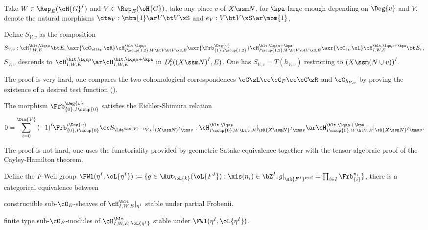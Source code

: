 \documentclass[a4paper, twoside]{article}
\begin{document}
\begin{stp}
	Take $W\in\Rep_{E}(\oH{G}^{I})$ and $V\in\Rep_{E}(\oH{G})$, take any place $v$ of $X\ssm N$, for $\kpa$ large enough depending on $\Deg{v}$ and $V$, denote the natural morphisms $\dta_{V}:\mbm{1}\ar V\bt V\xS$ and $e_{V}:V\bt V\xS\ar \mbm{1}$,
\end{stp}

\begin{thm}[$S=T$, {\cite[Proposition~6.2]{Lafforgue2018Chtoucas}}]
	Define $S_{V,v}$ as the composition
	\[
		S_{V,v}:\cH_{I,W,E}^{\blt,\lqs\mu}\bt E_{v}\axr{\cC_{\dta_{V}}\xR}\cH_{I\scup\{1,2\},W\bt V\bt V\xS,E}^{\blt,\lqs\mu}\axr{\Frb_{\{1\},I\scup\{1,2\}}^{\Deg{v}}}\cH_{I\scup\{1,2\},W\bt V\bt V\xS,E}^{\blt,\lqs\mu+\kpa}\axr{\cC_{e_{V}}\xL}\cH_{I,W,E}^{\blt,\lqs\mu+\kpa}\bt E_{v},
	\]
	$S_{V,v}$ descends to $\cH_{I,W,E}^{\blt,\lqs\mu}\ar\cH_{I,W,E}^{\blt,\lqs\mu+\kpa}$ in $D_{c}^{b}({(X\ssm N)}^{I},E)$. One has $S_{V,v}=T(h_{V,v})$ restricting to ${(X\ssm(N\cup v))}^{I}$.
\end{thm}

\begin{rmk}
	The proof is very hard, one compares the two cohomological correspondences $\cC\zL\cc\cC_{F}\cc\cC\zR$ and $\cC_{h_{V,v}}$ by proving the existence of a desired test function (\cite[Lemma~6.12, Lemma~6.13]{Lafforgue2018Chtoucas}).
\end{rmk}

\begin{thm}
	The morphism $\Frb_{\{0\},I\scup\{0\}}^{\Deg{v}}$ satisfies the Eichler-Shimura relation
	\[
		0=\sum_{i=0}^{\Dim{V}}{(-1)}^{i}\Frb_{\{0\},I\scup\{0\}}^{i\Deg{v}}\cc S_{\Lda^{\Dim{V}-i}V,v}|_{{(X\ssm N)}^{I}\tms v}:\cH_{I\scup\{0\},W\bt V,E}^{\blt,\lqs\mu}|_{\sR{X\ssm N}^{I}\tms v}\ar\cH_{I\scup\{0\},W\bt V,E}^{\blt,\lqs\mu+\kpa}|_{\sR{X\ssm N}^{I}\tms v}.
	\]
\end{thm}

\begin{rmk}
	The proof is not hard, one uses the functoriality provided by geometric Satake equivalence together with the tensor-algebraic proof of the Cayley-Hamilton theorem.
\end{rmk}


\begin{stp}
	Define the $F$-Weil group $\FWl(\eta^{I},\oL{\eta^{I}}):=\{g\in\Aut_{\oL{k}}(\oL{F^{I}}):\xis(n_{i})\in\bZ^{I}, g|_{\sR{F^{I}}^{\text{perf}}}=\prod_{i\in I}\Frb_{\{i\}}^{n_{i}}\}$, there is a categorical equivalence between
	\begin{itm}
		\item constructible sub-$\cO_{E}$-sheaves of $\cH_{I,W,E}^{\blt}|_{\eta^{I}}$ stable under partial Frobenii.
		\item finite type sub-$\cO_{E}$-modules of $\cH_{I,W,E}^{\blt}|_{\oL{\eta^{I}}}$ stable under $\FWl(\eta^{I},\oL{\eta^{I}})$.
	\end{itm}
\end{stp}
\end{document}
